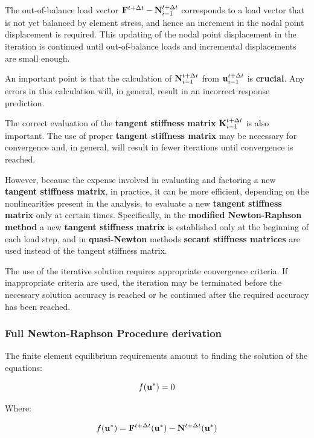 The out-of-balance load vector $ \mathbf{F}^{t + \Delta t} - \mathbf{N}_{i-1}^{t + \Delta t} $
corresponds to a load vector that is not yet balanced by element stress, and
hence an increment in the nodal point displacement is required. This updating of the
nodal point displacement in the iteration is continued until out-of-balance loads
and incremental displacements are small enough.

An important point is that the calculation of $ \mathbf{N}_{i-1}^{t + \Delta t} $
from $ \mathbf{u}_{i-1}^{t + \Delta t} $ is \textbf{crucial}. Any errors in this
calculation will, in general, result in an incorrect response prediction.

The correct evaluation of the \textbf{tangent stiffness matrix}
$ \mathbf{K}_{i-1}^{t + \Delta t} $ is also important. The use of proper
\textbf{tangent stiffness matrix} may be necessary for convergence and, in general,
will result in fewer iterations until convergence is reached.

However, because the expense involved in evaluating and factoring a new
\textbf{tangent stiffness matrix}, in practice, it can be more efficient,
depending on the nonlinearities present in the analysis, to evaluate a new
\textbf{tangent stiffness matrix} only at certain times. Specifically,
in the \textbf{modified Newton-Raphson method} a new \textbf{tangent stiffness matrix}
is established only at the beginning of each load step, and in
\textbf{quasi-Newton} methods \textbf{secant stiffness matrices} are used
instead of the tangent stiffness matrix.

The use of the iterative solution requires appropriate convergence criteria.
If inappropriate criteria are used, the iteration may be terminated before
the necessary solution accuracy is reached or be continued after the required
accuracy has been reached.

\subsubsection{Full Newton-Raphson Procedure derivation}

The finite element equilibrium requirements amount to finding the solution
of the equations:

\begin{equation}\label{nr-error}
    f( \mathbf{u}^* ) = 0
\end{equation}

Where:

\begin{equation}\label{nr-error-expanded}
    f( \mathbf{u}^* ) = \mathbf{F}^{t + \Delta t} ( \mathbf{u}^* )
    - \mathbf{N}^{t + \Delta t} ( \mathbf{u}^* )
\end{equation}

